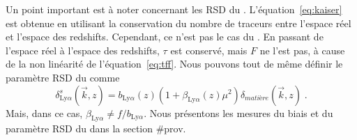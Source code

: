 \documentclass[11pt, twoside, a4paper, openright]{report}
\begin{document}
Un point important est à noter concernant les RSD du \lya{}.
L'équation~\ref{eq:kaiser} est obtenue en utilisant la conservation du nombre de traceurs entre l'espace réel et l'espace des redshifts. Cependant, ce n'est pas le cas du \lya{}.
En passant de l'espace réel à l'espace des redshifts, $\tau$ est conservé, mais $F$ ne l'est pas, à cause de la non linéarité de l'équation~\ref{eq:tff}.
Nous pouvons tout de même définir le paramètre RSD du \lya{} comme
\begin{equation}
  \label{eq:kaiser4}
  \delta_{\mathrm{Ly}\alpha}^{s}(\vec k, z) = b_{\mathrm{Ly}\alpha}(z) (1+ \beta_{\mathrm{Ly}\alpha}(z) \mu^2) \delta_{matière}(\vec k, z)   \; .
\end{equation}
Mais, dans ce cas, $ \beta_{\mathrm{Ly}\alpha} \neq f / b_{\mathrm{Ly}\alpha}$.
Nous présentons les mesures du biais et du paramètre RSD du \lya{} dans la section \#prov.
\end{document}
